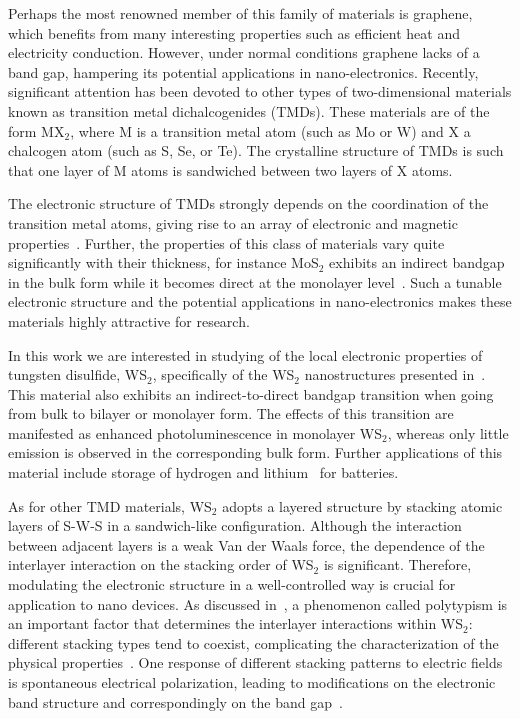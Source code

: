 


Perhaps the most renowned member of this family of materials is graphene,
which benefits from many interesting properties such as efficient heat and electricity conduction.
%
However, under normal conditions graphene lacks of a band gap, hampering its potential
applications in nano-electronics.
%
Recently, significant attention has been devoted to other types
of two-dimensional materials known as  transition metal dichalcogenides (TMDs).
%
These materials are of the form MX$_2$, where M is a 
transition metal atom (such as Mo or W) and X a chalcogen atom (such as S, Se, or Te). 
%
The crystalline structure of TMDs is such that
one layer of M atoms is sandwiched between two layers of X atoms.

The electronic structure of TMDs strongly depends on the coordination 
of the transition metal atoms, giving rise to an array of electronic
and magnetic properties~\cite{Chhowalla:2013}.
%
Further, the properties of this class of materials vary quite significantly
with their thickness, for instance MoS$_2$ exhibits an indirect bandgap
in the bulk form while it becomes direct at the monolayer level~\cite{Splendiani:2010}.
%
Such a tunable electronic structure and the potential applications in
nano-electronics makes these materials highly attractive for research. 

In this work we are interested in studying of the local electronic
properties of tungsten disulfide, WS$_2$, specifically of the
WS$_2$ nanostructures presented in~\cite{SabryaWS2}.
%
This material also exhibits an indirect-to-direct bandgap transition when going
from bulk to bilayer or monolayer form.
%
The effects of this transition are manifested as enhanced
photoluminescence in monolayer WS$_2$, whereas only little emission is observed in
the corresponding bulk form.
%
Further applications of this material include storage of hydrogen 
and lithium~\cite{Bhandavat:2012} for batteries.

As for other TMD materials, WS$_2$ adopts a layered structure 
by stacking atomic layers of S-W-S in a sandwich-like configuration. 
%
Although the interaction between adjacent layers is a weak Van der Waals 
force, the dependence of the interlayer interaction on the stacking 
order of WS$_2$ is significant.
%
Therefore, modulating the electronic
structure in a well-controlled way is crucial for application to
nano devices.
%
As discussed in~\cite{SabryaWS2},
a phenomenon called polytypism is an important factor that determines the interlayer
interactions within WS$_2$: different stacking types tend to coexist, 
complicating the characterization of the physical properties~\cite{Na:2018}.
%
One response of different stacking patterns to electric fields is
spontaneous electrical polarization, leading to modifications on the 
electronic band structure and correspondingly on the band gap~\cite{Lee:2016}.


